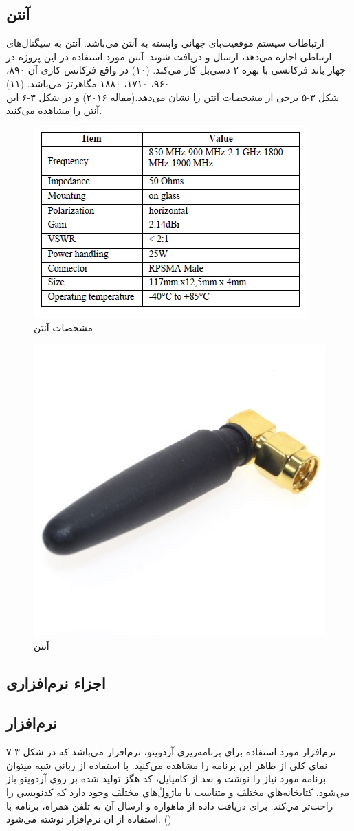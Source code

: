 \subsection{آنتن }
ارتباطات سیستم موقعیت‌بای جهانی وابسته به آنتن می‌باشد. آنتن به سیگنال‌های ارتباطی اجازه می‌دهد، ارسال و دریافت شوند. آنتن مورد استفاده در این پروژه در چهار باند فرکانسی با بهره ۲ دسی‌بل کار می‌کند. (۱۰) در واقع فرکانس کاری آن ۸۹۰، ۹۶۰، ۱۷۱۰، ۱۸۸۰ مگاهرتز می‌باشد. (۱۱)
\\
شکل ۳-۵ برخی از مشخصات آنتن را نشان می‌دهد.(مقاله ۲۰۱۶) و در شکل ۳-۶ این آنتن را مشاهده می‌کنید.
\begin{figure}[!h]
	\centerline{\includegraphics[width=.6\textwidth]{table1}}
	\caption{مشخصات آنتن }
\end{figure}
\begin{figure}[!h]
	\centerline{\includegraphics[width=.3\textwidth]{GSM-antenna}}
	\caption{آنتن }
\end{figure}

\subsection{اجزاء نرم‌افزاری}
\subsection{نرم‌افزار }
نرم‌افزار مورد استفاده براي برنامه‌ريزي آردوينو، نرم‌افزار   مي‌باشد كه در شکل ۳-۷ نماي كلي از ظاهر اين برنامه را مشاهده مي‌كنيد. با استفاده از زباني شبه  ميتوان برنامه مورد نياز را نوشت و بعد از كامپايل، كد هگز توليد شده بر روي آردوينو باز مي‌شود. كتابخانه‌هاي مختلف و متناسب با ماژولٰ‌هاي مختلف وجود دارد كه كدنويسي را راحت‌تر مي‌كند. برای دریافت داده از ماهواره و ارسال آن به تلفن همراه، برنامه با استفاده از ان نرم‌افزار نوشته می‌شود. ()
